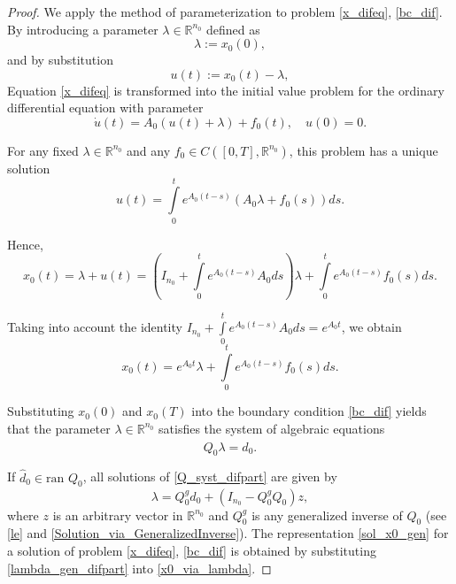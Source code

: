 \documentclass[preprint,12pt]{elsarticle}
\numberwithin{equation}{section}
\theoremstyle{definition}
\begin{document}
\begin{proof}
We apply the method of parameterization \cite{Dzhumabaev:1989} to problem \eqref{x_difeq}, \eqref{bc_dif}. By introducing a parameter $\lambda\in\mathbb{R}^{n_0}$ defined as
\begin{equation*}
    \lambda:=x_0(0),
\end{equation*}
and by substitution
\begin{equation*}
    u(t):=x_0(t)-\lambda,
\end{equation*}
Equation \eqref{x_difeq} is transformed into the initial value problem for the ordinary differential equation with parameter
\begin{equation*}\label{ivp_difpart}
\dot{u}(t)=A_0(u(t)+\lambda)+f_0(t),\quad
u(0)=0.
\end{equation*}


 For any fixed  $\lambda\in \mathbb{R}^{n_0}$ and any $f_0\in C([0,T],\mathbb{R}^{n_0})$, this problem has a unique solution
\begin{equation*}
\label{u_diff}
  u(t)=\int\limits_0^t e^{A_0(t-s)}(A_0\lambda+f_0(s)) ds.
  \end{equation*}

Hence,
\begin{equation*}
    x_0(t)=\lambda+u(t)=\left(I_{n_0}+\int\limits_0^t e^{A_0(t-s)}A_0ds\right)\lambda+\int\limits_0^t e^{A_0(t-s)}f_0(s)ds.
\end{equation*}

Taking into account the identity $I_{n_0}+\int\limits_0^t e^{A_0(t-s)} A_0ds=e^{A_0t}$, we obtain
\begin{equation}\label{x0_via_lambda}
    x_0(t)=e^{A_0t}\lambda+\int\limits_0^t e^{A_0(t-s)}f_0(s)ds.
\end{equation}

Substituting $x_0(0)$ and $x_0(T)$ into the boundary condition \eqref{bc_dif} yields that
the parameter $\lambda\in\mathbb{R}^{n_0}$ satisfies the system of algebraic equations
\begin{equation}\label{Q_syst_difpart}
    Q_0\lambda=\widehat{d}_0.
\end{equation}

If $\hat{d}_0\in \text{ran~}Q_0$, all solutions of \eqref{Q_syst_difpart} are given by
\begin{equation}\label{lambda_gen_difpart}
    \lambda=Q_0^g \widehat{d}_0+(I_{n_0}-Q_0^g Q_0)z,
\end{equation}
where  $z$ is an arbitrary vector in $\mathbb{R}^{n_0}$ and $Q_0^g$ is any generalized inverse of $Q_0$ (see \eqref{le} and \eqref{Solution_via_GeneralizedInverse}).  The representation \eqref{sol_x0_gen} for a solution of problem \eqref{x_difeq}, \eqref{bc_dif} is obtained by substituting  \eqref{lambda_gen_difpart}  into \eqref{x0_via_lambda}.
\end{proof}
\end{document}
